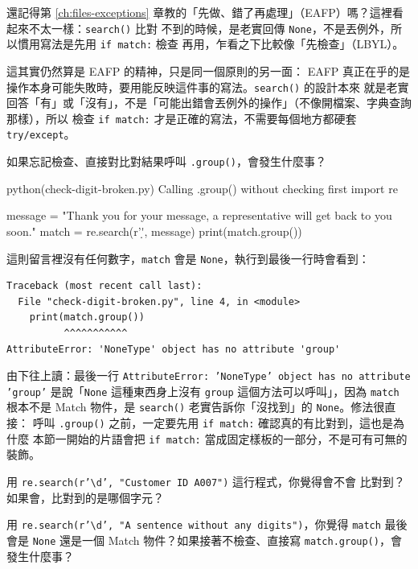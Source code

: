 還記得第 \ref{ch:files-exceptions} 章教的「先做、錯了再處理」（EAFP）嗎？這裡看起來不太一樣：\texttt{search()} 比對
不到的時候，是老實回傳 \texttt{None}，不是丟例外，所以慣用寫法是先用 \texttt{if match:} 檢查
再用，乍看之下比較像「先檢查」（LBYL）。

這其實仍然算是 EAFP 的精神，只是同一個原則的另一面：
EAFP 真正在乎的是操作本身可能失敗時，要用能反映這件事的寫法。\texttt{search()} 的設計本來
就是老實回答「有」或「沒有」，不是「可能出錯會丟例外的操作」（不像開檔案、字典查詢那樣），所以
檢查 \texttt{if match:} 才是正確的寫法，不需要每個地方都硬套 \texttt{try/except}。

如果忘記檢查、直接對比對結果呼叫 \texttt{.group()}，會發生什麼事？

\begin{example}{python}{(check-digit-broken.py) Calling .group() without checking first}
import re

message = "Thank you for your message, a representative will get back to you soon."
match = re.search(r'\d', message)
print(match.group())
\end{example}

這則留言裡沒有任何數字，\texttt{match} 會是 \texttt{None}，執行到最後一行時會看到：

\begin{verbatim}
Traceback (most recent call last):
  File "check-digit-broken.py", line 4, in <module>
    print(match.group())
          ^^^^^^^^^^^
AttributeError: 'NoneType' object has no attribute 'group'
\end{verbatim}

由下往上讀：最後一行 \texttt{AttributeError: 'NoneType' object has no attribute 'group'}
是說「\texttt{None} 這種東西身上沒有 \texttt{group} 這個方法可以呼叫」，因為 \texttt{match}
根本不是 Match 物件，是 \texttt{search()} 老實告訴你「沒找到」的 \texttt{None}。修法很直接：
呼叫 \texttt{.group()} 之前，一定要先用 \texttt{if match:} 確認真的有比對到，這也是為什麼
本節一開始的片語會把 \texttt{if match:} 當成固定樣板的一部分，不是可有可無的裝飾。

\begin{drills}[label=drills:regex-basics]
\item 用 \texttt{re.search(r'\textbackslash d', "Customer ID A007")} 這行程式，你覺得會不會
比對到？如果會，比對到的是哪個字元？
\item 用 \texttt{re.search(r'\textbackslash d', "A sentence without any digits")}，你覺得 \texttt{match}
最後會是 \texttt{None} 還是一個 Match 物件？如果接著不檢查、直接寫
\texttt{match.group()}，會發生什麼事？
\end{drills}

